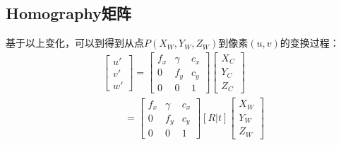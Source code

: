 \documentclass[12pt]{book}
\begin{document}
\subsection{Homography矩阵}
基于以上变化，可以到得到从点$P({X_W},{Y_W},{Z_W})$到像素$(u, v)$的变换过程：
\begin{equation}\label{world_to_pixel}
\begin{array}{l}
	\left[ {\begin{array}{*{20}{c}}
			{u'}\\
			{v'}\\
			{w'}
	\end{array}} \right] = \left[ {\begin{array}{*{20}{c}}
			{{f_x}}&\gamma &{{c_x}}\\
			0&{{f_y}}&{{c_y}}\\
			0&0&1
	\end{array}} \right]\left[ {\begin{array}{*{20}{c}}
			{{X_C}}\\
			{{Y_C}}\\
			{{Z_C}}
	\end{array}} \right]\\
\ \ \ \ \ \ \ \ \ \ = \left[ {\begin{array}{*{20}{c}}
			{{f_x}}&\gamma &{{c_x}}\\
			0&{{f_y}}&{{c_y}}\\
			0&0&1
	\end{array}} \right][R|t]\left[ {\begin{array}{*{20}{c}}
			{{X_W}}\\
			{{Y_W}}\\
			{{Z_W}}
	\end{array}} \right]
\end{array}
\end{equation}
\end{document}
